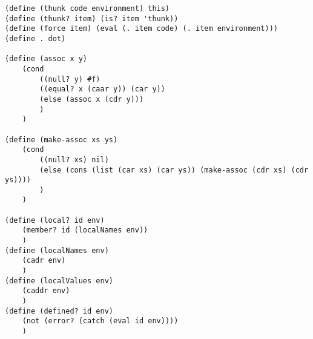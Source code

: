 \begin{verbatim}
(define (thunk code environment) this)
(define (thunk? item) (is? item 'thunk))
(define (force item) (eval (. item code) (. item environment)))
(define . dot)

(define (assoc x y)
    (cond
        ((null? y) #f)
        ((equal? x (caar y)) (car y))
        (else (assoc x (cdr y)))
        )
    )

(define (make-assoc xs ys)
    (cond
        ((null? xs) nil)
        (else (cons (list (car xs) (car ys)) (make-assoc (cdr xs) (cdr ys))))
        )
    )

(define (local? id env)
    (member? id (localNames env))
    )
(define (localNames env)
    (cadr env)
    )
(define (localValues env)
    (caddr env)
    )
(define (defined? id env)
    (not (error? (catch (eval id env))))
    )

\end{verbatim}

